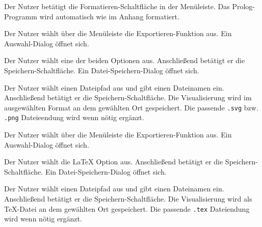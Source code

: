 \documentclass[parskip=full,11pt,twoside]{scrartcl}
\begin{document}


{Der Nutzer betätigt die Formatieren-Schaltfläche in der Menüleiste.}
{Das Prolog-Programm wird automatisch wie im Anhang formatiert.}



{Der Nutzer wählt über die Menüleiste die Exportieren-Funktion aus.}
{Ein Auswahl-Dialog öffnet sich.}

{Der Nutzer wählt eine der beiden Optionen aus. Anschließend betätigt er die Speichern-Schaltfläche.}
{Ein Datei-Speichern-Dialog öffnet sich.}

{Der Nutzer wählt einen Dateipfad aus und gibt einen Dateinamen ein. Anschließend betätigt er die Speichern-Schaltfläche.}
{Die Visualisierung wird im ausgewählten Format an dem gewählten Ort gespeichert. Die passende \texttt{.svg} bzw. \texttt{.png} Dateieendung wird wenn nötig ergänzt.}



{Der Nutzer wählt über die Menüleiste die Exportieren-Funktion aus.}
{Ein Auswahl-Dialog öffnet sich.}

{Der Nutzer wählt die LaTeX Option aus. Anschließend betätigt er die Speichern-Schaltfläche.}
{Ein Datei-Speichern-Dialog öffnet sich.}

{Der Nutzer wählt einen Dateipfad aus und gibt einen Dateinamen ein. Anschließend betätigt er die Speichern-Schaltfläche.}
{Die Visualisierung wird als TeX-Datei an dem gewählten Ort gespeichert. Die passende \texttt{.tex} Dateiendung wird wenn nötig ergänzt.}
\end{document}
